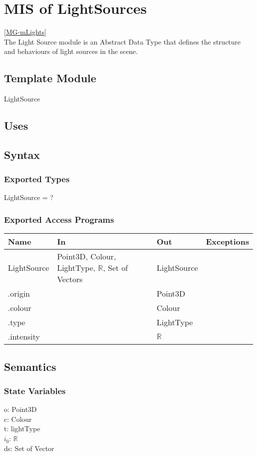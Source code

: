 \documentclass[12pt, titlepage]{article}
\begin{document}
\newpage

\section{MIS of LightSources} \ref{MG-mLights} \\
The Light Source module is an Abstract Data Type that defines the structure and 
behaviours of light sources in the scene.
\subsection{Template Module}
LightSource

\subsection{Uses}

\subsection{Syntax}
\subsubsection{Exported Types}
LightSource = ?

\subsubsection{Exported Access Programs}
\begin{center}
	\begin{tabular}{p{2cm} p{7cm} p{2cm} p{2cm}}
		\hline
		\textbf{Name} & \textbf{In} & \textbf{Out} & \textbf{Exceptions} \\
		\hline
		LightSource & Point3D, Colour, LightType, $\mathbb{R}$, Set of Vectors 
		& 
		LightSource & \\
		.origin & & Point3D & \\
		.colour & & Colour & \\
		.type & & LightType & \\
		.intensity & & $\mathbb{R}$ & \\
		\hline
	\end{tabular}
\end{center}

\subsection{Semantics}
\subsubsection{State Variables}
o: Point3D \\ %
c: Colour \\
t: lightType \\
$i_{0}$: $\mathbb{R}$ \\
ds: Set of Vector \\ %
\end{document}
